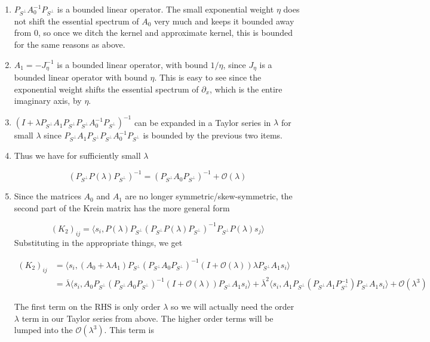 \documentclass[12pt]{article}
\begin{document}
\begin{enumerate}
\item $P_{S^\perp} A_0^{-1} P_{S^\perp}$ is a bounded linear operator. The small exponential weight $\eta$ does not shift the essential spectrum of $A_0$ very much and keeps it bounded away from 0, so once we ditch the kernel and approximate kernel, this is bounded for the same reasons as above.

\item $A_1 = -J_\eta^{-1}$ is a bounded linear operator, with bound $1/\eta$, since $J_\eta$ is a bounded linear operator with bound $\eta$. This is easy to see since the exponential weight shifts the essential spectrum of $\partial_x$, which is the entire imaginary axis, by $\eta$.

\item $( I + \lambda P_{S^\perp} A_1 P_{S^\perp}P_{S^\perp}A_0^{-1}P_{S^\perp} )^{-1}$ can be expanded in a Taylor series in $\lambda$ for small $\lambda$ since $P_{S^\perp} A_1 P_{S^\perp}P_{S^\perp}A_0^{-1}P_{S^\perp}$ is bounded by the previous two items.
\item Thus we have for sufficiently small $\lambda$

\[
(P_{S^\perp} P(\lambda) P_{S^\perp})^{-1} = (P_{S^\perp} A_0 P_{S^\perp})^{-1} + \mathcal{O}(\lambda)
\]

\item Since the matrices $A_0$ and $A_1$ are no longer symmetric/skew-symmetric, the second part of the Krein matrix has the more general form

\[
(K_2)_{ij} = \langle s_i, P(\lambda) P_{S^\perp} ( P_{S^\perp} P(\lambda) P_{S^\perp})^{-1} P_{S^\perp} P(\lambda) s_j \rangle
\]
Substituting in the appropriate things, we get

\begin{align*}
(K_2)_{ij} &= \langle s_i, (A_0 + \lambda A_1) P_{S^\perp} ( P_{S^\perp} A_0 P_{S^\perp})^{-1}(I + \mathcal{O}(\lambda) )\lambda P_{S^\perp} A_1 s_i \rangle\\
&= \overline{\lambda} \langle s_i, A_0 P_{S^\perp} ( P_{S^\perp} A_0 P_{S^\perp})^{-1}(I + \mathcal{O}(\lambda) ) P_{S^\perp} A_1 s_i  \rangle 
+ \overline{\lambda}^2 \langle s_i, A_1 P_{S^\perp} ( P_{S^\perp} A_1 P_{S^\perp}^{-1}) P_{S^\perp} A_1 s_i  \rangle + \mathcal{O}(\lambda^3) 
\end{align*}

The first term on the RHS is only order $\lambda$ so we will actually need the order $\lambda$ term in our Taylor series from above. The higher order terms will be lumped into the $\mathcal{O}(\lambda^3)$. This term is


\end{enumerate}
\end{document}
